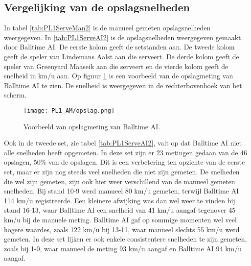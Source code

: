 \subsection{Vergelijking van de opslagsnelheden}
In tabel \ref{tab:PL1ServeMan2} is de manueel gemeten opslagsnelheden weergegeven. In \ref{tab:PL1ServeAI2} is de opslagsnelheden weergegeven gemaakt door Balltime AI. De eerste kolom geeft de setstanden aan. De tweede kolom geeft de speler van Lindemans Aalst aan die serveert. De derde kolom geeft de speler van Greenyard Maaseik aan die serveert en de vierde kolom geeft de snelheid in km/u aan. Op figuur \ref{fig:PL1_Serve} is een voorbeeld van de opslagmeting van Balltime AI te zien. De snelheid is weergegeven in de rechterbovenhoek van het scherm.

\begin{figure}
  \centering
  \texttt{[image: PL1\_AM/opslag.png]}
  \caption{\label{fig:PL1_Serve}Voorbeeld van opslagmeting van Balltime AI.}
\end{figure}

Ook in de tweede set, zie tabel \ref{tab:PL1ServeAI2}, valt op dat Balltime AI niet alle snelheden heeft opgemeten. In deze set zijn er 23 metingen gedaan van de 46 opslagen, 50\% van de opslagen. Dit is een verbetering ten opzichte van de eerste set, maar er zijn nog steeds veel snelheden die niet zijn gemeten. De snelheden die wel zijn gemeten, zijn ook hier weer verschillend van de manueel gemeten snelheden. Bij stand 10-9 werd manueel 80 km/u gemeten, terwijl Balltime AI 114 km/u registreerde. Een kleinere afwijking was dan wel weer te vinden bij stand 16-13, waar Balltime AI een snelheid van 41 km/u aangaf tegenover 45 km/u bij de manuele meting. Balltime AI gaf op sommige momenten wel veel hogere waardes, zoals 122 km/u bij 13-11, waar manueel slechts 55 km/u werd gemeten. In deze set lijken er ook enkele consistentere snelheden te zijn gemeten, zoals bij 1-0, waar manueel de meting 93 km/u aangaf en Balltime AI 94 km/u aangaf.

